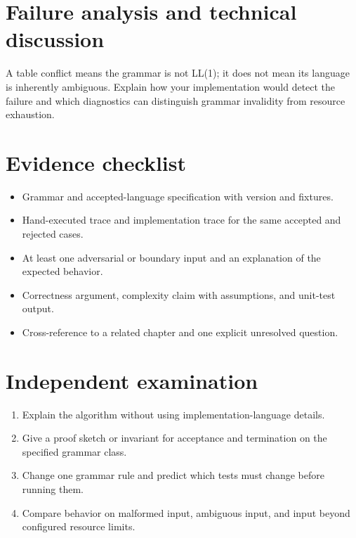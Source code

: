 \documentclass[11pt,letterpaper]{article}
\begin{document}
\section{Failure analysis and technical discussion}
A table conflict means the grammar is not LL(1); it does not mean its language is inherently ambiguous. Explain how your implementation would detect the failure and which diagnostics can distinguish grammar invalidity from resource exhaustion.
\section{Evidence checklist}
\begin{itemize}
\item Grammar and accepted-language specification with version and fixtures.
\item Hand-executed trace and implementation trace for the same accepted and rejected cases.
\item At least one adversarial or boundary input and an explanation of the expected behavior.
\item Correctness argument, complexity claim with assumptions, and unit-test output.
\item Cross-reference to a related chapter and one explicit unresolved question.
\end{itemize}
\section{Independent examination}
\begin{enumerate}
\item Explain the algorithm without using implementation-language details.
\item Give a proof sketch or invariant for acceptance and termination on the specified grammar class.
\item Change one grammar rule and predict which tests must change before running them.
\item Compare behavior on malformed input, ambiguous input, and input beyond configured resource limits.
\end{enumerate}
\end{document}
